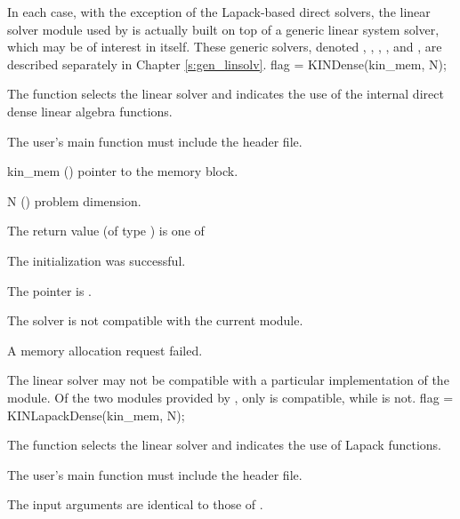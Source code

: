 In each case, with the exception of the Lapack-based direct solvers,
the linear solver module used by {\kinsol} is actually built
on top of a generic linear system solver, which may be of interest in itself.
These generic solvers, denoted {\dense}, {\band}, {\spgmr}, {\spbcg}, and {\sptfqmr},
are described separately in Chapter \ref{s:gen_linsolv}.
{
  flag = KINDense(kin\_mem, N);
}
{
  The function  selects the {\kindense} linear solver and indicates
  the use of the internal direct dense linear algebra functions. 

  The user's main function must include the  header file.
}
{
  \begin{args}
  \item[kin\_mem] ()
    pointer to the {\kinsol} memory block.
  \item[N] ()
    problem dimension.
  \end{args}
}
{
  The return value  (of type ) is one of
  \begin{args}
  \item[\Id{KINDLS\_SUCCESS}] 
    The {\kindense} initialization was successful.
  \item[\Id{KINDLS\_MEM\_NULL}]
    The  pointer is .
  \item[\Id{KINDLS\_ILL\_INPUT}]
    The {\kindense} solver is not compatible with the current {\nvector} module.
  \item[\Id{KINDLS\_MEM\_FAIL}]
    A memory allocation request failed.
  \end{args}
}
{
  The {\kindense} linear solver may not be compatible with a particular
  implementation of the {\nvector} module. 
  Of the two {\nvector} modules provided by {\sundials}, only {\nvecs} is 
  compatible, while {\nvecp} is not.
}
{
  flag = KINLapackDense(kin\_mem, N);
}
{
  The function  selects the {\kindense} linear solver and 
  indicates the use of Lapack functions. 

  The user's main function must include the  header file.
}
{
  The input arguments are identical to those of .
}
